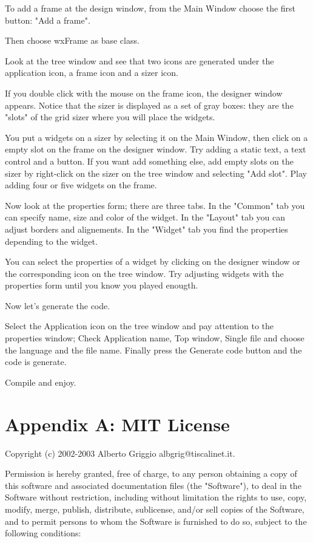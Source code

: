 \documentclass[a4paper,10pt]{report}
\begin{document}
To add a frame at the design window, from the Main Window choose
the first button: "Add a frame".

Then choose wxFrame as base class.

Look at the tree window and see that two icons are generated
under the application icon, a frame icon and a sizer icon.

If you double click with the mouse on the frame icon, the designer
window appears.
Notice that the sizer is displayed as a set of gray boxes: they are
the "slots" of the grid sizer where you will place the widgets.

You put a widgets on a sizer by selecting it on the Main Window,
then click on a empty slot on the frame on the designer window.
Try adding a static text, a text control and a button.
If you want add something else, add empty slots on the sizer by
right-click on the sizer on the tree window and selecting "Add slot".
Play adding four or five widgets on the frame.

Now look at the properties form; there are three tabs. In the "Common"
tab you can specify name, size and color of the widget.
In the "Layout" tab you can adjust borders and alignements.
In the "Widget" tab you find the properties depending to the
widget.

You can select the properties of a widget by clicking on the designer window
or the corresponding icon on the tree window.
Try adjusting widgets with the properties form until you know you
played enougth.

Now let's generate the code.

Select the Application icon on the tree window and
pay attention to the properties window; 
Check Application name, Top window, Single file and choose the language 
and the file name.
Finally press the Generate code button and the code is generate.

Compile and enjoy.



\appendix

\chapter{Appendix A: MIT License}
Copyright (c) 2002-2003 Alberto Griggio  albgrig@tiscalinet.it.

Permission is hereby granted, free of charge, to any person obtaining
a copy of
this software and associated documentation files (the "Software"),
to deal in
the Software without restriction, including without limitation
the rights to
use, copy, modify, merge, publish, distribute, sublicense, and/or
sell copies
of the Software, and to permit persons to whom the Software is
furnished to do
so, subject to the following conditions:
\end{document}

